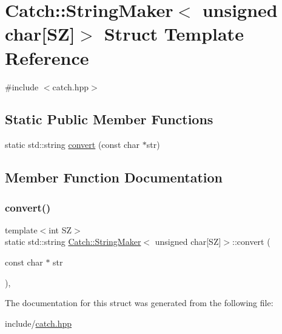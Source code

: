 \hypertarget{structCatch_1_1StringMaker_3_01unsigned_01char[SZ]_4}{}\section{Catch\+:\+:String\+Maker$<$ unsigned char\mbox{[}SZ\mbox{]}$>$ Struct Template Reference}
\label{structCatch_1_1StringMaker_3_01unsigned_01char[SZ]_4}


{\ttfamily \#include $<$catch.\+hpp$>$}

\subsection*{Static Public Member Functions}
\begin{DoxyCompactItemize}
\item 
static std\+::string \mbox{\hyperlink{structCatch_1_1StringMaker_3_01unsigned_01char[SZ]_4_a615e17b55a978cd279442fa293f773f0}{convert}} (const char $\ast$str)
\end{DoxyCompactItemize}


\subsection{Member Function Documentation}
\mbox{\label{structCatch_1_1StringMaker_3_01unsigned_01char[SZ]_4_a615e17b55a978cd279442fa293f773f0}} 
\subsubsection{\texorpdfstring{convert()}{convert()}}
{\footnotesize\ttfamily template$<$int SZ$>$ \\
static std\+::string \mbox{\hyperlink{structCatch_1_1StringMaker}{Catch\+::\+String\+Maker}}$<$ unsigned char\mbox{[}SZ\mbox{]}$>$\+::convert (\begin{DoxyParamCaption}\item[{const char $\ast$}]{str }\end{DoxyParamCaption})\hspace{0.3cm}{\ttfamily [inline]}, {\ttfamily [static]}}



The documentation for this struct was generated from the following file\+:\begin{DoxyCompactItemize}
\item 
include/\mbox{\hyperlink{catch_8hpp}{catch.\+hpp}}\end{DoxyCompactItemize}
